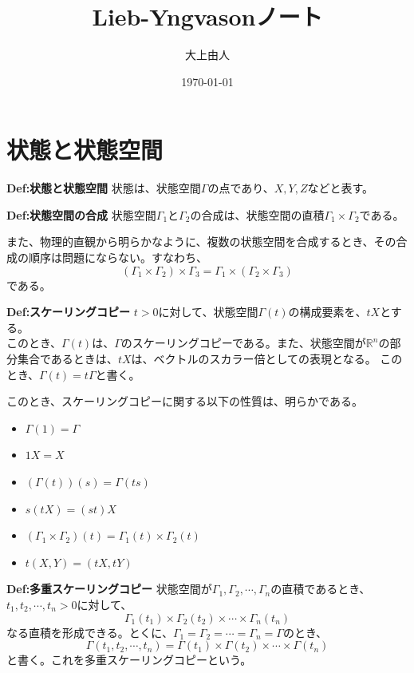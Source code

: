 \documentclass[a4paper,11pt]{jsarticle}
\begin{document}
\title{Lieb-Yngvasonノート}
\author{大上由人}
\date{\today}
\maketitle
\tableofcontents
\newpage

\section{状態と状態空間}
\begin{itembox}[l]{\textbf{Def:状態と状態空間}}
状態は、状態空間$\Gamma$の点であり、$X,Y,Z$などと表す。
\end{itembox}

\begin{itembox}[l]{\textbf{Def:状態空間の合成}}
    状態空間$\Gamma_1$と$\Gamma_2$の合成は、状態空間の直積$\Gamma_1 \times \Gamma_2$である。\\
\end{itembox}
また、物理的直観から明らかなように、複数の状態空間を合成するとき、その合成の順序は問題にならない。すなわち、
\begin{equation}
    (\Gamma_1 \times \Gamma_2) \times \Gamma_3 = \Gamma_1 \times (\Gamma_2 \times \Gamma_3)
\end{equation}
である。

\begin{itembox}[l]{\textbf{Def:スケーリングコピー}}
    $t>0$に対して、状態空間$\Gamma(t)$の構成要素を、$tX$とする。\\
    このとき、$\Gamma(t)$は、$\Gamma$のスケーリングコピーである。また、状態空間が$\mathbb{R}^n$の部分集合であるときは、$tX$は、ベクトルのスカラー倍としての表現となる。
    このとき、$\Gamma(t)=t\Gamma$と書く。
\end{itembox}
このとき、スケーリングコピーに関する以下の性質は、明らかである。
\begin{itemize}
    \item $\Gamma(1)=\Gamma$
    \item $1X=X$
    \item $(\Gamma(t))(s)=\Gamma(ts)$
    \item $s(tX)=(st)X$
    \item $(\Gamma_1 \times \Gamma_2)(t)=\Gamma_1(t) \times \Gamma_2(t)$
    \item $t(X,Y)=(tX,tY)$
\end{itemize}

\begin{itembox}[l]{\textbf{Def:多重スケーリングコピー}}
    状態空間が$\Gamma_1,\Gamma_2,\cdots,\Gamma_n$の直積であるとき、$t_1,t_2,\cdots,t_n>0$に対して、
    \begin{equation}
        \Gamma_1(t_1) \times \Gamma_2(t_2) \times \cdots \times \Gamma_n(t_n)
    \end{equation}
    なる直積を形成できる。とくに、$\Gamma_1=\Gamma_2=\cdots=\Gamma_n=\Gamma$のとき、
    \begin{equation}
        \Gamma(t_1,t_2,\cdots,t_n)=\Gamma(t_1) \times \Gamma(t_2) \times \cdots \times \Gamma(t_n)
    \end{equation}
    と書く。これを多重スケーリングコピーという。
\end{itembox}
\end{document}
